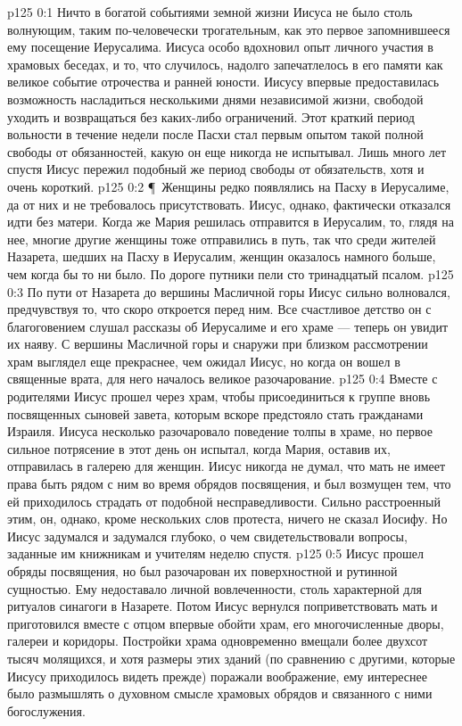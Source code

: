 \vs p125 0:1 Ничто в богатой событиями земной жизни Иисуса не было столь волнующим, таким по\hyp{}человечески трогательным, как это первое запомнившееся ему посещение Иерусалима. Иисуса особо вдохновил опыт личного участия в храмовых беседах, и то, что случилось, надолго запечатлелось в его памяти как великое событие отрочества и ранней юности. Иисусу впервые предоставилась возможность насладиться несколькими днями независимой жизни, свободой уходить и возвращаться без каких\hyp{}либо ограничений. Этот краткий период вольности в течение недели после Пасхи стал первым опытом такой полной свободы от обязанностей, какую он еще никогда не испытывал. Лишь много лет спустя Иисус пережил подобный же период свободы от обязательств, хотя и очень короткий.
\vs p125 0:2 \P\ Женщины редко появлялись на Пасху в Иерусалиме, да от них и не требовалось присутствовать. Иисус, однако, фактически отказался идти без матери. Когда же Мария решилась отправится в Иерусалим, то, глядя на нее, многие другие женщины тоже отправились в путь, так что среди жителей Назарета, шедших на Пасху в Иерусалим, женщин оказалось намного больше, чем когда бы то ни было. По дороге путники пели сто тринадцатый псалом.
\vs p125 0:3 По пути от Назарета до вершины Масличной горы Иисус сильно волновался, предчувствуя то, что скоро откроется перед ним. Все счастливое детство он с благоговением слушал рассказы об Иерусалиме и его храме --- теперь он увидит их наяву. С вершины Масличной горы и снаружи при близком рассмотрении храм выглядел еще прекраснее, чем ожидал Иисус, но когда он вошел в священные врата, для него началось великое разочарование.
\vs p125 0:4 Вместе с родителями Иисус прошел через храм, чтобы присоединиться к группе вновь посвященных сыновей завета, которым вскоре предстояло стать гражданами Израиля. Иисуса несколько разочаровало поведение толпы в храме, но первое сильное потрясение в этот день он испытал, когда Мария, оставив их, отправилась в галерею для женщин. Иисус никогда не думал, что мать не имеет права быть рядом с ним во время обрядов посвящения, и был возмущен тем, что ей приходилось страдать от подобной несправедливости. Сильно расстроенный этим, он, однако, кроме нескольких слов протеста, ничего не сказал Иосифу. Но Иисус задумался и задумался глубоко, о чем свидетельствовали вопросы, заданные им книжникам и учителям неделю спустя.
\vs p125 0:5 Иисус прошел обряды посвящения, но был разочарован их поверхностной и рутинной сущностью. Ему недоставало личной вовлеченности, столь характерной для ритуалов синагоги в Назарете. Потом Иисус вернулся поприветствовать мать и приготовился вместе с отцом впервые обойти храм, его многочисленные дворы, галереи и коридоры. Постройки храма одновременно вмещали более двухсот тысяч молящихся, и хотя размеры этих зданий (по сравнению с другими, которые Иисусу приходилось видеть прежде) поражали воображение, ему интереснее было размышлять о духовном смысле храмовых обрядов и связанного с ними богослужения.
